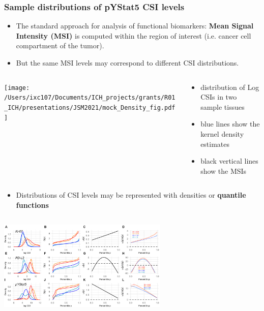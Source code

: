 \documentclass[t,8pt]{beamer}
\begin{document}


	
	\frame
	{\frametitle{Sample distributions of pYStat5 CSI levels}   
\begin{itemize}
	\item The standard approach for analysis of functional biomarkers: \textbf{Mean Signal Intensity (MSI)} is computed within the region
of interest (i.e. cancer cell compartment of the tumor).
		 \color{red}	
                   \item But the same MSI levels  may correspond to different CSI distributions. 
       		\color{black}	
          \end{itemize}  

  \begin{columns}[T]
		      \begin{column}{0.65\textwidth}
			\texttt{[image: /Users/ixc107/Documents/ICH\_projects/grants/R01\_ICH/presentations/JSM2021/mock\_Density\_fig.pdf]}
		      \end{column}
		\begin{column}{0.3\textwidth}
		\begin{itemize}
		  \item distribution of Log CSIs in two sample tissues
              	  \item  blue lines show the kernel density estimates 
	  	   \item  black vertical lines show the MSIs
             \end{itemize}  
		\end{column}		
	\end{columns}
\begin{itemize}
 \color{red}
	\item Distributions of CSI levels may be represented with densities or \textbf{quantile functions}
  \color{black}		
          \end{itemize}  		
	 
	  \begin{columns}[T]
		\begin{column}{0.65\textwidth}
			 \includegraphics[width=3.2in] {Figures/densities_quantiles.pdf}
		\end{column}
		

\end{columns}}
\end{document}
